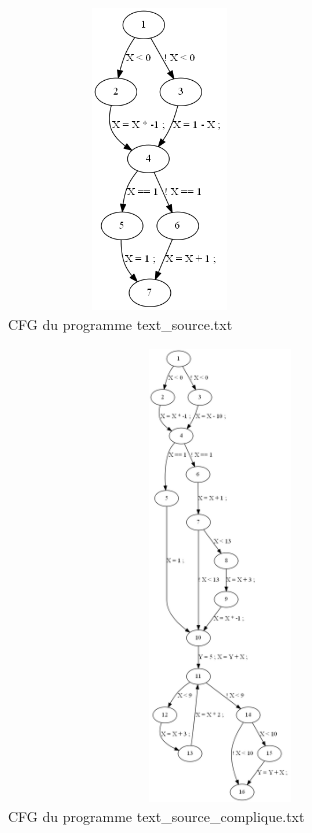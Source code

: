 \documentclass[a4paper]{article}
\begin{document}
\begin{figure}[h!]
  \centering
  \includegraphics[width=8cm,height=8cm,keepaspectratio]{input/text_source_cfg.png}
  \caption{CFG du programme text\_source.txt}
  \label{fig:cfg2}
\end{figure}

\begin{figure}[h!]
  \centering
  \includegraphics[width=12cm,height=12cm,keepaspectratio]{input/text_source_complique_cfg.png}
  \caption{CFG du programme text\_source\_complique.txt}
  \label{fig:cfg3}
\end{figure}
\end{document}

